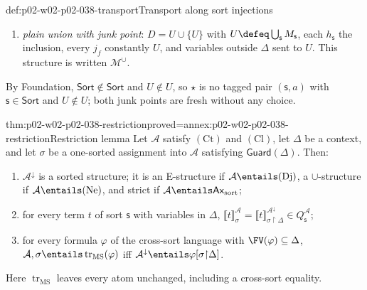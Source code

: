 \begin{hbdefinition}{def:p02-w02-p02-038-transport}{Transport along sort injections}
\begin{enumerate}
      assignment \(s\): the same \(D\) without \(\star\), the same
      \(h\), and \(j_f\) constantly \(h_{\mathsf s}(s(x^{\mathsf s}))\) for
      \(f\) of codomain \(\mathsf s\); one-sorted variables outside the
      image of the variable injection go to one fixed element of \(D\).
      This structure is written \(\mathcal M^{\sharp}_{s}\);
\item \emph{plain union with junk point}: \(D=U\cup\{U\}\) with
      \(U\defeq\bigcup_{\mathsf s}M_{\mathsf s}\), each \(h_{\mathsf s}\) the
      inclusion, every \(j_f\) constantly \(U\), and variables outside
      \(\Delta\) sent to \(U\).  This structure is written
      \(\mathcal M^{\cup}\).
\end{enumerate}
By Foundation, \(\mathsf{Sort}\notin\mathsf{Sort}\) and \(U\notin U\), so
\(\star\) is no tagged pair \((\mathsf s,a)\) with \(\mathsf s\in\mathsf{Sort}\)
and \(U\notin U\); both junk points are fresh without any choice.
\end{hbdefinition}

\begin{hblemma}{thm:p02-w02-p02-038-restriction}{proved=annex:p02-w02-p02-038-restriction}{Restriction lemma}
Let \(\mathcal A\) satisfy \((\mathrm{Ct})\) and \((\mathrm{Cl})\), let
\(\Delta\) be a context, and let \(\sigma\) be a one-sorted assignment into
\(\mathcal A\) satisfying \(\mathsf{Guard}(\Delta)\).  Then:
\begin{enumerate}
\item \(\mathcal A^{\downarrow}\) is a sorted structure; it is an E-structure
      if \(\mathcal A\entails(\mathrm{Dj})\), a \(\cup\)-structure if
      \(\mathcal A\entails(\mathrm{Ne})\), and strict if
      \(\mathcal A\entails\mathsf{Ax}_{\mathrm{sort}}\);
\item for every term \(t\) of sort \(\mathsf s\) with variables in
      \(\Delta\),
      \(\llbracket t\rrbracket^{\mathcal A}_{\sigma}=
      \llbracket t\rrbracket^{\mathcal A^{\downarrow}}_{\sigma\restriction\Delta}
      \in Q_{\mathsf s}^{\mathcal A}\);
\item for every formula \(\varphi\) of the cross-sort language with
      \(\FV(\varphi)\subseteq\Delta\),
      \(\mathcal A,\sigma\entails\operatorname{tr}_{\mathrm{MS}}(\varphi)\)
      iff
      \(\mathcal A^{\downarrow}\entails\varphi[\sigma{\restriction}\Delta]\).
\end{enumerate}
Here \(\operatorname{tr}_{\mathrm{MS}}\) leaves every atom unchanged,
including a cross-sort equality.
\end{hblemma}

